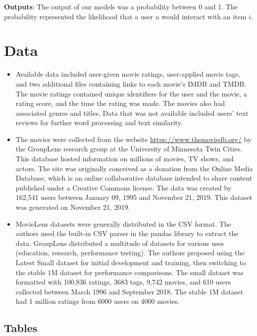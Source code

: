 \documentclass{article}
\begin{document}
\textbf{Outputs}: The output of our models was a probability between 0 and 1. The probability represented the likelihood that a user $u$ would interact with an item $i$.

\section{Data}
\label{sec:Data}

\begin{itemize}
\item Available data included user-given movie ratings, user-applied movie tags, and two additional files containing links to each movie's IMDB and TMDB. The movie ratings contained unique identifiers for the user and the movie, a rating score, and the time the rating was made. The movies also had associated genres and titles. Data that was not available included users' text reviews for further word processing and text similarity.
\item The movies were collected from the website \url{https://www.themoviedb.org/} by the GroupLens research group at the University of Minnesota Twin Cities. This database hosted information on millions of movies, TV shows, and actors. The site was originally conceived as a donation from the Online Media Database, which is an online collaborative database intended to share content published under a Creative Commons license. The data was created by 162,541 users between January 09, 1995 and November 21, 2019. This dataset was generated on November 21, 2019.
\item MovieLens datasets were generally distributed in the CSV format. The authors used the built-in CSV parser in the pandas library to extract the data. GroupLens distributed a multitude of datasets for various uses (education, research, performance testing). The authors proposed using the Latest Small dataset for initial development and training, then switching to the stable 1M dataset for performance comparisons. The small dataset was formatted with 100,836 ratings, 3683 tags, 9,742 movies, and 610 users collected between March 1996 and September 2018. The stable 1M dataset had 1 million ratings from 6000 users on 4000 movies.

\end{itemize}


\subsection{Tables}
\end{document}
